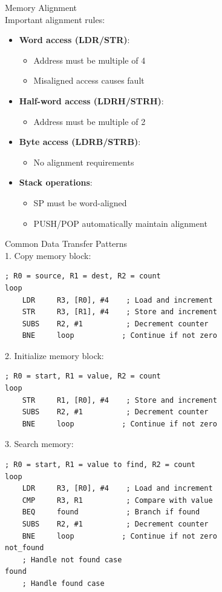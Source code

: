 \begin{concept}{Memory Alignment}\\
Important alignment rules:
\begin{itemize}
  \item \textbf{Word access (LDR/STR)}:
    \begin{itemize}
      \item Address must be multiple of 4
      \item Misaligned access causes fault
    \end{itemize}
  \item \textbf{Half-word access (LDRH/STRH)}:
    \begin{itemize}
      \item Address must be multiple of 2
    \end{itemize}
  \item \textbf{Byte access (LDRB/STRB)}:
    \begin{itemize}
      \item No alignment requirements
    \end{itemize}
  \item \textbf{Stack operations}:
    \begin{itemize}
      \item SP must be word-aligned
      \item PUSH/POP automatically maintain alignment
    \end{itemize}
\end{itemize}
\end{concept}

\begin{KR}{Common Data Transfer Patterns}\\
1. Copy memory block:
\begin{lstlisting}[language=armasm, style=base]
    ; R0 = source, R1 = dest, R2 = count
loop
    LDR     R3, [R0], #4    ; Load and increment
    STR     R3, [R1], #4    ; Store and increment
    SUBS    R2, #1          ; Decrement counter
    BNE     loop           ; Continue if not zero
\end{lstlisting}

2. Initialize memory block:
\begin{lstlisting}[language=armasm, style=base]
    ; R0 = start, R1 = value, R2 = count
loop
    STR     R1, [R0], #4    ; Store and increment
    SUBS    R2, #1          ; Decrement counter
    BNE     loop           ; Continue if not zero
\end{lstlisting}

3. Search memory:
\begin{lstlisting}[language=armasm, style=base]
    ; R0 = start, R1 = value to find, R2 = count
loop
    LDR     R3, [R0], #4    ; Load and increment
    CMP     R3, R1          ; Compare with value
    BEQ     found           ; Branch if found
    SUBS    R2, #1          ; Decrement counter
    BNE     loop           ; Continue if not zero
not_found
    ; Handle not found case
found
    ; Handle found case
\end{lstlisting}
\end{KR}

